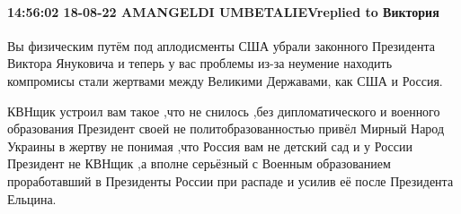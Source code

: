 \paragraph{14:56:02 18-08-22 AMANGELDI UMBETALIEVreplied to Виктория}

Вы физическим путём под аплодисменты США убрали законного Президента Виктора
Януковича и теперь у вас проблемы из-за неумение находить компромисы стали
жертвами между Великими Державами, как США и Россия.

КВНщик устроил вам такое ,что не снилось ,без дипломатического и военного
образования Президент своей не политобразованностью привёл Мирный Народ Украины
в жертву не понимая ,что Россия вам не детский сад и у России Президент не
КВНщик ,а вполне серьёзный с Военным образованием проработавший в Президенты
России при распаде и усилив её после Президента Ельцина.
